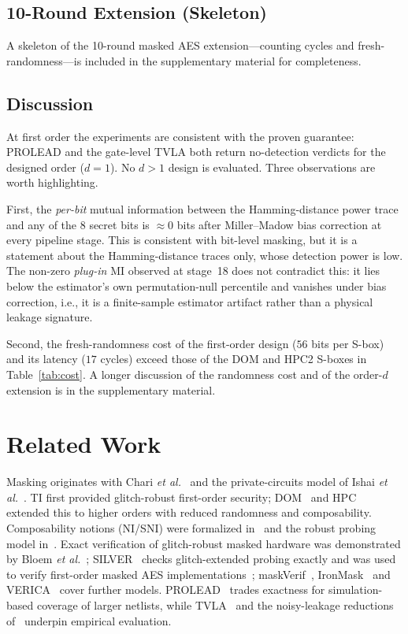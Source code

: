\documentclass[lettersize,journal]{IEEEtran}
\begin{document}
\subsection*{10-Round Extension (Skeleton)}
A skeleton of the 10-round masked AES extension---counting cycles and
fresh-randomness---is included in the supplementary material for completeness.

\subsection{Discussion}
At first order the experiments are consistent with the proven
guarantee: PROLEAD and the gate-level TVLA both return no-detection
verdicts for the designed order ($d{=}1$).  No $d{>}1$ design is
evaluated.  Three observations are worth
highlighting.

First, the \emph{per-bit} mutual information between the Hamming-distance
power trace and any of the 8 secret bits is $\approx 0$ bits after
Miller--Madow bias correction at every pipeline stage.  This is
consistent with bit-level masking, but it is a statement about the
Hamming-distance traces only, whose detection power is low.  The non-zero
\emph{plug-in} MI observed at stage~18 does not contradict this: it
lies below the estimator's own permutation-null percentile and
vanishes under bias correction, i.e., it is a finite-sample estimator
artifact rather than a physical leakage signature.

Second, the fresh-randomness cost of the first-order design ($56$ bits
per S-box) and its latency ($17$ cycles) exceed those of the DOM and HPC2
S-boxes in Table~\ref{tab:cost}.  A longer discussion of the randomness
cost and of the order-$d$ extension is in the supplementary material.

\section{Related Work}
\label{sec:related}
Masking originates with Chari \emph{et al.}~\cite{chari1999towards} and the
private-circuits model of Ishai \emph{et al.}~\cite{ishai2003private}. TI
\cite{nikova2006threshold} first provided glitch-robust first-order security;
DOM~\cite{gross2016dom} and HPC~\cite{cassiers2020hpc} extended this to higher
orders with reduced randomness and composability. Composability notions (NI/SNI)
were formalized in~\cite{barthe2016strong} and the robust probing model
in~\cite{faust2018composable}. Exact verification of glitch-robust masked hardware was
demonstrated by Bloem \emph{et al.}~\cite{bloem2018formal}; SILVER~\cite{knichel2020silver}
checks glitch-extended probing exactly and was used to verify
first-order masked AES implementations~\cite{shahmirzadi2021records};
maskVerif~\cite{maskverif2015}, IronMask~\cite{ironmask2022} and
VERICA~\cite{verica2022} cover further models. PROLEAD~\cite{muller2022prolead}
trades exactness for simulation-based coverage of larger netlists, while
TVLA~\cite{goodwill2011tvla} and the noisy-leakage reductions
of~\cite{duc2014unifying} underpin empirical evaluation.
\end{document}
